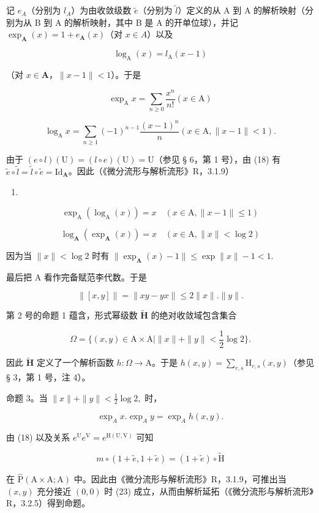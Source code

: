 记 \(e_{A}\)（分别为 \(l_{A}\)）为由收敛级数 \(\tilde{e}\)（分别为 \(\tilde{l}\)）定义的从 A 到 A 的解析映射（分别为从 B 到 A 的解析映射，其中 B 是 A 的开单位球），并记 \(\exp_{\mathbf{A}}(x)=1+e_{\mathbf{A}}(x)\)（对 \(x\in A\)）以及

\[
\log_ {\mathrm{A}} (x) = l _ {\mathrm{A}} (x - 1)
\]

（对 \(x \in \mathbf{A}\)，\(\| x - 1\| < 1\)）。于是

\[
\exp_ {\mathrm{A}} x = \sum_ {n \geqslant 0} \frac {x ^ {n}}{n !} (x \in \mathrm{A})\tag{19}
\]

\[
\log_ {\mathrm{A}} x = \sum_ {n \geqslant 1} (- 1) ^ {n - 1} \frac {(x - 1) ^ {n}}{n} (x \in \mathrm{A}, \| x - 1 \| <   1).\tag{20}
\]

由于 \((e\circ l)(\mathrm{U}) = (l\circ e)(\mathrm{U}) = \mathrm{U}\)（参见 § 6，第 1 号），由 (18) 有 \(\tilde{e}\circ \tilde{l} = \tilde{l}\circ \tilde{e} = \mathrm{Id}_{\mathbf{A}}\)。因此（《微分流形与解析流形》R，3.1.9）

\begin{enumerate}
\def\labelenumi{(\arabic{enumi})}
\setcounter{enumi}{20}
\tightlist
\item
\end{enumerate}

\[
\exp_ {\mathrm{A}} (\log_ {\mathrm{A}} (x)) = x \quad (x \in \mathrm{A}, \| x - 1 \| \leqslant 1)\tag{21}
\]

\[
\log_ {\mathbf {A}} (\exp_ {\mathbf {A}} (x)) = x \quad (x \in \mathrm{A}, \| x \| <   \log 2)\tag{22}
\]

因为当 \(\| x\| < \log 2\) 时有 \(\| \exp_{\mathbf{A}}(x) - 1\| \leqslant \exp \| x\| -1 < 1.\)

最后把 A 看作完备赋范李代数。于是

\[
\| [ x, y ] \| = \| x y - y x \| \leqslant 2 \| x \|. \| y \|.
\]

第 2 号的命题 1 蕴含，形式幂级数 \(\tilde{\mathbf{H}}\) 的绝对收敛域包含集合

\[
\Omega = \{(x, y) \in \mathrm{A} \times \mathrm{A} | \| x \| + \| y \| <   \frac {1}{2} \log 2 \}.
\]

因此 \(\tilde{\mathbf{H}}\) 定义了一个解析函数 \(h\colon \Omega \to \mathrm{A}\)。于是 \(h(x,y) = \sum_{r,s}\mathrm{H}_{r,s}(x,y)\)（参见 § 3，第 1 号，注 4）。

命题 3。当 \(\| x\| + \| y\| < \frac{1}{2}\log 2,\) 时，

\[
\exp_ {A} x. \exp_ {A} y = \exp_ {A} h (x, y).\tag{23}
\]

由 (18) 以及关系 \(e^{\mathrm{U}}e^{\mathrm{V}} = e^{\mathrm{H}(\mathrm{U},\mathrm{V})}\) 可知

\[
m \circ (1 + \tilde {e}, 1 + \tilde {e}) = (1 + \tilde {e}) \circ \tilde {\mathrm{H}}
\]

在 \(\hat{\mathrm{P}} (\mathrm{A}\times \mathrm{A};\mathrm{A})\) 中。因此由《微分流形与解析流形》R，3.1.9，可推出当 \((x,y)\) 充分接近 \((0,0)\) 时 (23) 成立，从而由解析延拓（《微分流形与解析流形》R，3.2.5）得到命题。

